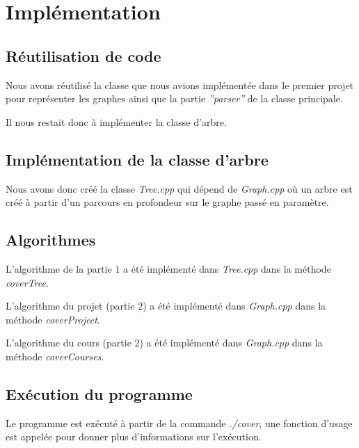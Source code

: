  \section{Implémentation}

  \subsection{Réutilisation de code}
  Nous avons réutilisé la classe que nous avions implémentée dans le
  premier projet pour représenter les graphes ainsi que la partie
  \emph{''parser''} de la classe principale.

  Il nous restait donc à implémenter la classe d'arbre.

  \subsection{Implémentation de la classe d'arbre}
  Nous avons donc créé la classe \emph{Tree.cpp} qui dépend de
  \emph{Graph.cpp} où un arbre est créé à partir d'un parcours en
  profondeur sur le graphe passé en paramètre.

  \subsection{Algorithmes}
  L'algorithme de la partie $1$ a été implémenté dans \emph{Tree.cpp}
  dans la méthode \emph{coverTree}.

  L'algorithme du projet (partie $2$) a été implémenté dans
  \emph{Graph.cpp} dans la méthode \emph{coverProject}.

  L'algorithme du cours (partie $2$) a été implémenté dans
  \emph{Graph.cpp} dans la méthode \emph{coverCourses}.

  \subsection{Exécution du programme}
  Le programme est exécuté à partir de la commande \emph{./cover}, une
  fonction d'usage est appelée pour donner plus d'informations sur
  l'exécution.